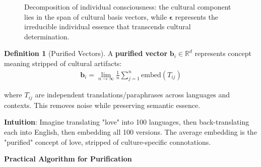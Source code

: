 \documentclass[11pt,a4paper]{article}
\theoremstyle{definition}
\newtheorem{definition}{Definition}[section]
\theoremstyle{remark}
\newcommand{\RR}{\mathbb{R}}
\newcommand{\CC}{\mathcal{C}}
\newcommand{\bb}{\mathbf{b}}
\newcommand{\cc}{\mathbf{c}}
\begin{document}
\begin{small}
\begin{figure}[H]
\caption{Decomposition of individual consciousness: the cultural component lies in the span of cultural basis vectors, while \(\boldsymbol{\epsilon}\) represents the irreducible individual essence that transcends cultural determination.}
\label{fig:consciousness_decomposition}
\end{figure}

\begin{definition}[Purified Vectors]
A \textbf{purified vector} \(\bb_i \in \RR^d\) represents concept meaning stripped of cultural artifacts:
\begin{align}
\bb_i = \lim_{n \rightarrow \infty} \frac{1}{n} \sum_{j=1}^n \text{embed}(T_{ij})
\end{align}

where \(T_{ij}\) are independent translations/paraphrases across languages and contexts. This removes noise while preserving semantic essence.

\textbf{Intuition}: Imagine translating "love" into 100 languages, then back-translating each into English, then embedding all 100 versions. The average embedding is the "purified" concept of love, stripped of culture-specific connotations.
\end{definition}

\begin{mdframed}[backgroundcolor=green!10,linewidth=2pt]
\textbf{Practical Algorithm for Purification}


\end{mdframed}
\end{small}
\end{document}
